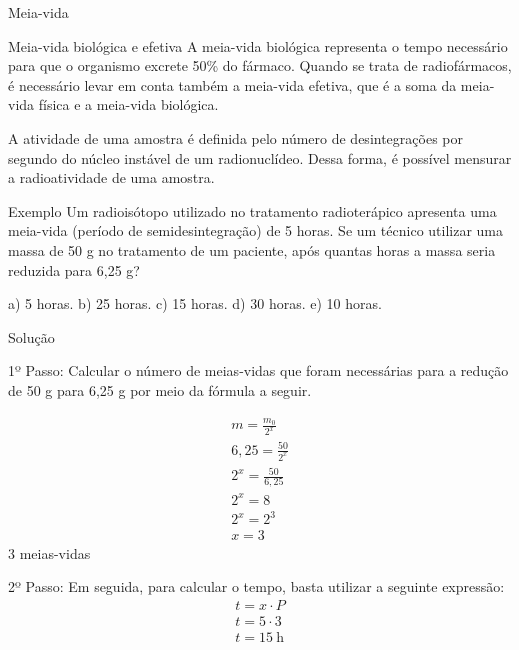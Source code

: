 \documentclass[presentation]{beamer}
\begin{document}
\begin{frame}[label={sec:org3134f85}]{Meia-vida}
\begin{block}{Meia-vida biológica e efetiva}
A meia-vida biológica representa o tempo necessário para que o organismo excrete 50\% do fármaco. Quando se trata de radiofármacos, é necessário levar em conta também a meia-vida efetiva, que é a soma da meia-vida física e a meia-vida biológica.

A atividade de uma amostra é definida pelo número de desintegrações por segundo do núcleo instável de um radionuclídeo. Dessa forma, é possível mensurar a radioatividade de uma amostra. 
\end{block}

\begin{block}{}
\vspace{-1cm}
\begin{boxex}{Exemplo}
Um radioisótopo utilizado no tratamento radioterápico apresenta uma meia-vida (período de semidesintegração) de 5 horas. Se um técnico utilizar uma massa de 50 g no tratamento de um paciente, após quantas horas a massa seria reduzida para 6,25 g?

a) 5 horas.  \quad b) 25 horas. \quad c) 15 horas. \quad d) 30 horas. \quad e) 10 horas.


\begin{myrule}{Solução}
\begin{minipage}{0.5\textwidth}


\alert{1º Passo:} Calcular o número de meias-vidas que foram necessárias para a redução de 50 g para 6,25 g por meio da fórmula a seguir.

\begin{align*}
m=\frac{m_0}{2^x} \\
6,25 = \frac{50}{2^x}\\
2^x= \frac{50}{6,25}\\
2^x=8 \\
2^x = 2^3 \\
x= 3
\end{align*}
3 meias-vidas
\end{minipage}
\hspace{0.05\textwidth}
\begin{minipage}{0.4\textwidth}
\alert{2º Passo:} Em seguida, para calcular o tempo, basta utilizar a seguinte expressão:
\begin{align*}
t = x \cdot P \\
t = 5 \cdot 3 \\
t = 15 ~ \text{h}
\end{align*}
\end{minipage}
\end{myrule}
\end{boxex}
\end{block}
\end{frame}
\end{document}
